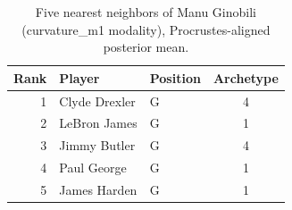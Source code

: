 \begin{table}[htbp]
  \centering\small
  \begin{tabular}{rllc}
    \toprule
    Rank & Player & Position & Archetype \\
    \midrule
    1 & Clyde Drexler & G & 4 \\
    2 & LeBron James & G & 1 \\
    3 & Jimmy Butler & G & 4 \\
    4 & Paul George & G & 1 \\
    5 & James Harden & G & 1 \\
    \bottomrule
  \end{tabular}
  \caption{Five nearest neighbors of Manu Ginobili (curvature_m1 modality), Procrustes-aligned posterior mean.}
  \label{tab:Manu_Ginobili_neighbors_curvature_m1}
\end{table}

